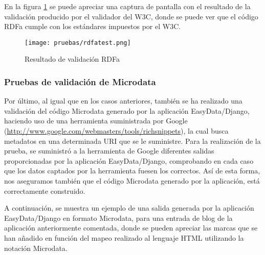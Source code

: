 En la figura \ref{fig:rdfatest} se puede apreciar una captura de pantalla con el
resultado de la validación producido por el validador del W3C, donde se puede
ver que el código RDFa cumple con los estándares impuestos por el W3C.

\newpage

\begin{figure}[H]
    \begin{center}
        \texttt{[image: pruebas/rdfatest.png]}
    \end{center}
    \caption{Resultado de validación RDFa}
    \label{fig:rdfatest}
\end{figure}


\subsubsection{Pruebas de validación de Microdata}

Por último, al igual que en los casos anteriores, también se ha realizado una
validación del código Microdata generado por la aplicación EasyData/Django,
haciendo uso de una herramienta suministrada por Google
(\url{http://www.google.com/webmasters/tools/richsnippets}), la cual busca
metadatos en una determinada URI que se le suministre. Para la realización de la
prueba, se suministró a la herramienta de Google diferentes salidas
proporcionadas por la aplicación EasyData/Django, comprobando en cada caso que
los datos captados por la herramienta fuesen los correctos. Así de esta forma,
nos aseguramos también que el código Microdata generado por la aplicación, está
correctamente construido.

A continuación, se muestra un ejemplo de una salida generada por la aplicación
EasyData/Django en formato Microdata, para una entrada de blog de la aplicación
anteriormente comentada, donde se pueden apreciar las marcas que se han añadido
en función del mapeo realizado al lenguaje HTML utilizando la notación Microdata.

